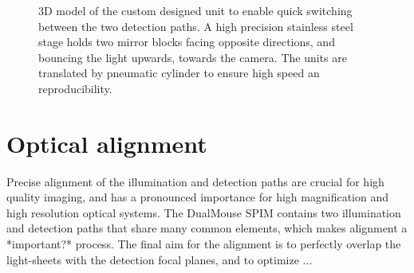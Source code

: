       \begin{figure}[htb]
        \centering
          \caption[Detection branch merging unit]{3D model of the custom designed unit to enable quick switching between the two detection paths. A high precision stainless steel stage holds two mirror blocks facing opposite directions, and bouncing the light upwards, towards the camera. The units are translated by  pneumatic cylinder to ensure high speed an reproducibility.}
          \label{fig:DualMirror}
        \end{figure}


\section{Optical alignment}
  Precise alignment of the illumination and detection paths are crucial for high quality imaging, and has a pronounced  importance for high magnification and high resolution optical systems. The DualMouse SPIM contains two illumination and detection paths that share many common elements, which makes alignment a *important?* process. The final aim for the alignment is to perfectly overlap the light-sheets with the detection focal planes, and to optimize ... 

